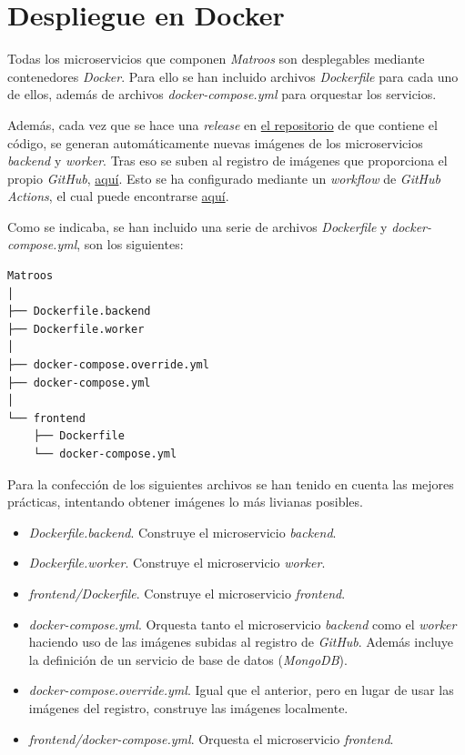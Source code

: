 \section{Despliegue en Docker}

Todas los microservicios que componen \textit{Matroos} son desplegables mediante contenedores \textit{Docker}. Para ello se han incluido archivos \textit{Dockerfile} para cada uno de ellos, además de archivos \textit{docker-compose.yml} para orquestar los servicios.

Además, cada vez que se hace una \textit{release} en \href{https://github.com/harvestcore/matroos}{el repositorio} de que contiene el código, se generan automáticamente nuevas imágenes de los microservicios \textit{backend} y \textit{worker}. Tras eso se suben al registro de imágenes que proporciona el propio \textit{GitHub}, \href{https://github.com/harvestcore?tab=packages&repo_name=matroos}{aquí}. Esto se ha configurado mediante un \textit{workflow} de \textit{GitHub Actions}, el cual puede encontrarse \href{https://github.com/harvestcore/matroos/blob/develop/.github/workflows/build-docker-images.yml}{aquí}.

Como se indicaba, se han incluido una serie de archivos \textit{Dockerfile} y \textit{docker-compose.yml}, son los siguientes:

\begin{lstlisting}[style=tree]
Matroos
│
├── Dockerfile.backend
├── Dockerfile.worker
│
├── docker-compose.override.yml
├── docker-compose.yml
│
└── frontend
    ├── Dockerfile
    └── docker-compose.yml
\end{lstlisting}

Para la confección de los siguientes archivos se han tenido en cuenta las mejores prácticas, intentando obtener imágenes lo más livianas posibles.

\begin{itemize}
	\item \textit{Dockerfile.backend}. Construye el microservicio \textit{backend}.
	\item \textit{Dockerfile.worker}. Construye el microservicio \textit{worker}.
	\item \textit{frontend/Dockerfile}. Construye el microservicio \textit{frontend}.
\end{itemize}

\begin{itemize}
	\item \textit{docker-compose.yml}. Orquesta tanto el microservicio \textit{backend} como el \textit{worker} haciendo uso de las imágenes subidas al registro de \textit{GitHub}. Además incluye la definición de un servicio de base de datos (\textit{MongoDB}).
	\item \textit{docker-compose.override.yml}. Igual que el anterior, pero en lugar de usar las imágenes del registro, construye las imágenes localmente.
	\item \textit{frontend/docker-compose.yml}. Orquesta el microservicio \textit{frontend}.
\end{itemize}


